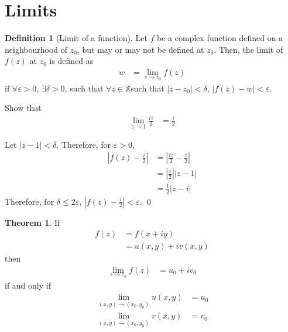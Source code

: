 \documentclass[titlepage, fleqn, a4paper, 12pt, twoside]{article}
\theoremstyle{definition}
\newtheorem{definition}{Definition}
\theoremstyle{theorem}
\newtheorem{theorem}{Theorem}
\begin{document}
\section{Limits}

\begin{definition}[Limit of a function]
	Let $f$ be a complex function defined on a neighbourhood of $z_0$, but may or may not be defined at $z_0$.
	Then, the limit of $f(z)$ at $z_0$ is defined as
	\begin{align*}
		w & = \lim\limits_{z \to z_0} f(z)
	\end{align*}
	if $\forall \varepsilon > 0$, $\exists \delta > 0$, such that $\forall z \in \mathbb{X}$such that $|z - z_0| < \delta$, $\left| f(z) - w \right| < \varepsilon$.
\end{definition}

\begin{question}
	Show that
	\begin{align*}
		\lim\limits_{z \to 1} \frac{i z}{2} & = \frac{i}{2}
	\end{align*}
\end{question}

\begin{solution}
	Let $|z - 1| < \delta$.
	Therefore, for $\varepsilon > 0$,
	\begin{align*}
		\left| f(z) - \frac{i}{2} \right| & = \left| \frac{i z}{2} - \frac{i}{2} \right| \\
                                                  & = \left| \frac{i}{2} \right| |z - 1|         \\
                                                  & = \frac{1}{2} \left| z - i \right|
	\end{align*}
	Therefore, for $\delta \le 2 \varepsilon$, $\left| f(z) - \frac{i}{2} \right| < \varepsilon$.
	\qed
\end{solution}

\begin{theorem}
	If
	\begin{align*}
		f(z) & = f(x + i y) \\
                     & = u(x,y) + i v(x,y)
	\end{align*}
	then
	\begin{align*}
		\lim\limits_{z \to z_0} f(z) & = u_0 + i v_0
	\end{align*}
	if and only if
	\begin{align*}
		\lim\limits_{(x,y) \to (x_0,y_0)} u(x,y) & = u_0 \\
		\lim\limits_{(x,y) \to (x_0,y_0)} v(x,y) & = v_0
	\end{align*}
\end{theorem}
\end{document}
